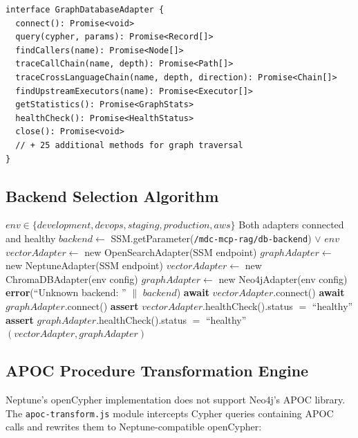 \documentclass[11pt,letterpaper]{article}
\begin{document}
\begin{lstlisting}[caption={GraphDatabaseAdapter interface (34 methods).}]
interface GraphDatabaseAdapter {
  connect(): Promise<void>
  query(cypher, params): Promise<Record[]>
  findCallers(name): Promise<Node[]>
  traceCallChain(name, depth): Promise<Path[]>
  traceCrossLanguageChain(name, depth, direction): Promise<Chain[]>
  findUpstreamExecutors(name): Promise<Executor[]>
  getStatistics(): Promise<GraphStats>
  healthCheck(): Promise<HealthStatus>
  close(): Promise<void>
  // + 25 additional methods for graph traversal
}
\end{lstlisting}

\subsection{Backend Selection Algorithm}

\begin{algorithm}[H]
\caption{Database Backend Selection}
\label{alg:backend-select}
\begin{algorithmic}[1]
\REQUIRE $env \in \{development, devops, staging, production, aws\}$
\ENSURE Both adapters connected and healthy
\STATE $backend \gets$ SSM.getParameter(\texttt{/mdc-mcp-rag/db-backend}) $\lor$ $env$
    \STATE $vectorAdapter \gets$ new OpenSearchAdapter(SSM endpoint)
    \STATE $graphAdapter \gets$ new NeptuneAdapter(SSM endpoint)
    \STATE $vectorAdapter \gets$ new ChromaDBAdapter(env config)
    \STATE $graphAdapter \gets$ new Neo4jAdapter(env config)
\ELSE
    \STATE \textbf{error}(``Unknown backend: '' $\|$ $backend$)
\ENDIF
\STATE \textbf{await} $vectorAdapter$.connect()
\STATE \textbf{await} $graphAdapter$.connect()
\STATE \textbf{assert} $vectorAdapter$.healthCheck().status $=$ ``healthy''
\STATE \textbf{assert} $graphAdapter$.healthCheck().status $=$ ``healthy''
\RETURN $(vectorAdapter, graphAdapter)$
\end{algorithmic}
\end{algorithm}

\subsection{APOC Procedure Transformation Engine}

Neptune's openCypher implementation does not support Neo4j's APOC library.
The \texttt{apoc-transform.js} module intercepts Cypher queries containing
APOC calls and rewrites them to Neptune-compatible openCypher:
\end{document}
